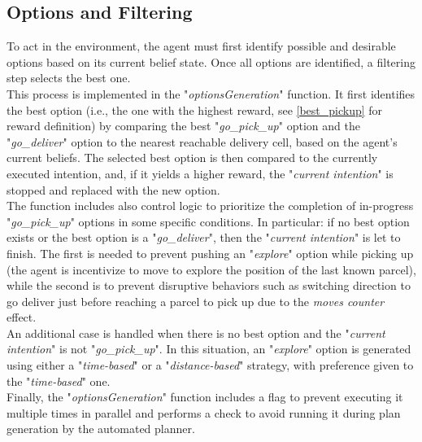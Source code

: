     \subsection{Options and Filtering}
        To act in the environment, the agent must first identify possible and desirable options based on its current belief state. Once all options are identified, a filtering step selects the best one.
        \medskip\\
        This process is implemented in the "\textit{optionsGeneration}" function. It first identifies the best option (i.e., the one with the highest reward, see \ref{best_pickup} for reward definition) by comparing the best "\textit{go\_pick\_up}" option and the "\textit{go\_deliver}" option to the nearest reachable delivery cell, based on the agent's current beliefs. The selected best option is then compared to the currently executed intention, and, if it yields a higher reward, the "\textit{current intention}" is stopped and replaced with the new option.
        \medskip\\
        The function includes also control logic to prioritize the completion of in-progress "\textit{go\_pick\_up}" options in some specific conditions. In particular: if no best option exists or the best option is a "\textit{go\_deliver}", then the "\textit{current intention}" is let to finish. The first is needed to prevent pushing an "\textit{explore}" option while picking up (the agent is incentivize to move to explore the position of the last known parcel), while the second is to prevent disruptive behaviors such as switching direction to go deliver just before reaching a parcel to pick up due to the \textit{moves counter} effect.
        \medskip\\
        An additional case is handled when there is no best option and the "\textit{current intention}" is not "\textit{go\_pick\_up}". In this situation, an "\textit{explore}" option is generated using either a "\textit{time-based}" or a "\textit{distance-based}" strategy, with preference given to the "\textit{time-based}" one.
        \medskip\\
        Finally, the "\textit{optionsGeneration}" function includes a flag to prevent executing it multiple times in parallel and performs a check to avoid running it during plan generation by the automated planner.
        
